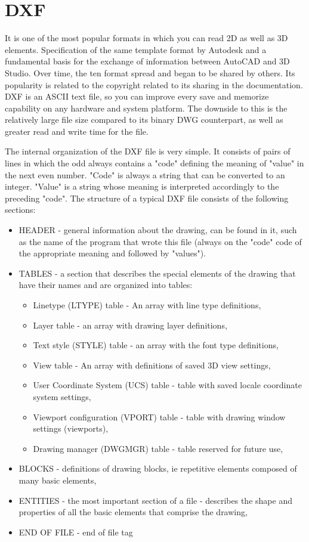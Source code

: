 \documentclass[a4paper, 11pt, article]{report}
\begin{document}
{{   
   \section{DXF}
   
   It is one of the most popular formats in which you can read 2D as well as 3D elements. Specification of the same template format by Autodesk and a fundamental basis for the exchange of information between AutoCAD and 3D Studio. Over time, the ten format spread and began to be shared by others. Its popularity is related to the copyright related to its sharing in the documentation. DXF is an ASCII text file, so you can improve every save and memorize capability on any hardware and system platform. The downside to this is the relatively large file size compared to its binary DWG counterpart, as well as greater read and write time for the file.
   
   
   The internal organization of the DXF file is very simple. It consists of pairs of lines in which the odd always contains a "code" defining the meaning of "value" in the next even number. "Code" is always a string that can be converted to an integer. "Value" is a string whose meaning is interpreted accordingly to the preceding "code".
The structure of a typical DXF file consists of the following sections:
\begin{itemize}
\item HEADER - general information about the drawing, can be found in it, such as the name of the program that wrote this file (always on the "code" code of the appropriate meaning and followed by "values").
\item TABLES - a section that describes the special elements of the drawing that have their names and are organized into tables:
\begin{itemize}
\item Linetype (LTYPE) table - An array with line type definitions,
\item Layer table - an array with drawing layer definitions,
\item Text style (STYLE) table - an array with the font type definitions,
\item View table - An array with definitions of saved 3D view settings,
\item User Coordinate System (UCS) table - table with saved locale coordinate system settings,
\item Viewport configuration (VPORT) table - table with drawing window settings (viewports),
\item Drawing manager (DWGMGR) table - table reserved for future use,
\end{itemize}
\item BLOCKS - definitions of drawing blocks, ie repetitive elements composed of many basic elements,
\item ENTITIES - the most important section of a file - describes the shape and properties of all the basic elements that comprise the drawing,
\item END OF FILE - end of file tag


\end{itemize}}}
\end{document}

